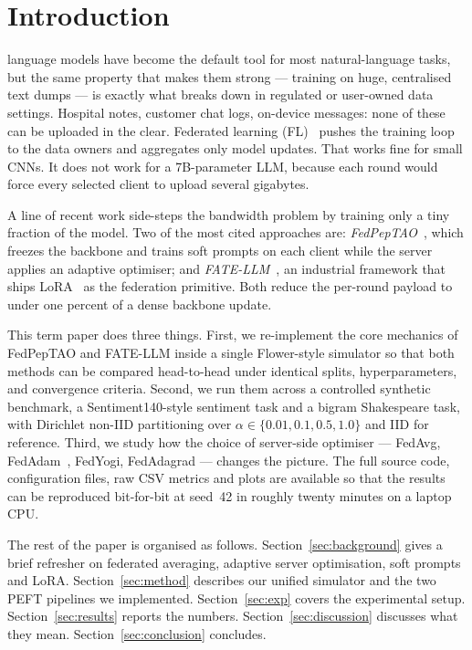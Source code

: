 \documentclass[journal]{IEEEtran}
\begin{document}
\IEEEpeerreviewmaketitle


\section{Introduction}
 language models have become the default tool
for most natural-language tasks, but the same property that makes them
strong --- training on huge, centralised text dumps --- is exactly what
breaks down in regulated or user-owned data settings. Hospital notes,
customer chat logs, on-device messages: none of these can be uploaded in
the clear. Federated learning (FL)~\cite{mcmahan2017} pushes the training
loop to the data owners and aggregates only model updates. That works
fine for small CNNs. It does not work for a 7B-parameter LLM, because
each round would force every selected client to upload several gigabytes.

A line of recent work side-steps the bandwidth problem by training only
a tiny fraction of the model. Two of the most cited approaches are:
\emph{FedPepTAO}~\cite{che2023}, which freezes the backbone and trains
soft prompts on each client while the server applies an adaptive optimiser;
and \emph{FATE-LLM}~\cite{fan2023}, an industrial framework that ships
LoRA~\cite{hu2022} as the federation primitive. Both reduce the per-round
payload to under one percent of a dense backbone update.

This term paper does three things. First, we re-implement the core mechanics
of FedPepTAO and FATE-LLM inside a single Flower-style simulator so that
both methods can be compared head-to-head under identical splits,
hyperparameters, and convergence criteria. Second, we run them across a
controlled synthetic benchmark, a Sentiment140-style sentiment task and a
bigram Shakespeare task, with Dirichlet non-IID partitioning over
$\alpha \in \{0.01, 0.1, 0.5, 1.0\}$ and IID for reference. Third, we study
how the choice of server-side optimiser --- FedAvg, FedAdam~\cite{reddi2021},
FedYogi, FedAdagrad --- changes the picture. The full source code,
configuration files, raw CSV metrics and plots are available so that the
results can be reproduced bit-for-bit at seed~42 in roughly twenty minutes
on a laptop CPU.

The rest of the paper is organised as follows. Section~\ref{sec:background}
gives a brief refresher on federated averaging, adaptive server optimisation,
soft prompts and LoRA. Section~\ref{sec:method} describes our unified
simulator and the two PEFT pipelines we implemented. Section~\ref{sec:exp}
covers the experimental setup. Section~\ref{sec:results} reports the
numbers. Section~\ref{sec:discussion} discusses what they mean.
Section~\ref{sec:conclusion} concludes.
\end{document}

